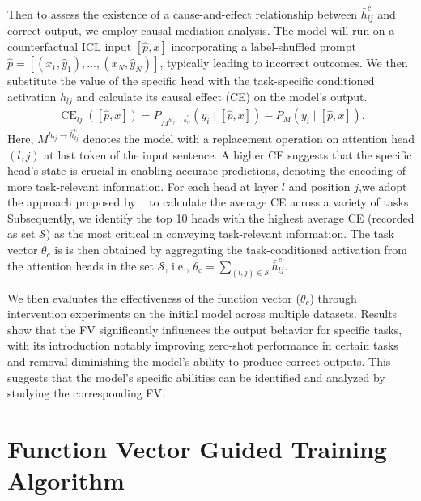 Then to assess the existence of a cause-and-effect relationship between $\bar{h}_{l j}^c$ and correct output, we employ causal mediation analysis. The model will run on a counterfactual ICL input $[\hat{p},x]$ incorporating a label-shuffled prompt $\hat{p}=[(x_1,  \hat{y}_1), ..., (x_N, \hat{y}_N)]$, typically leading to incorrect outcomes.
We then substitute the value of the specific head with the task-specific conditioned activation $\bar{h}_{lj}$ and calculate its causal effect (CE) on the model's output.
\begin{equation}
\begin{aligned}
\operatorname{CE}_{lj}([\hat{p},x])=P_{M^{h_{lj}\rightarrow \bar{h}_{lj}^c}}(y_{i} \mid [\hat{p}, x] ) -P_M(y_{i} \mid [\hat{p}, x]).
\end{aligned}
\end{equation}
Here, $M^{h_{lj}\rightarrow \bar{h}^c_{lj}}$ denotes the model with a replacement operation on attention head $(l,j)$ at last token of the input sentence. A higher CE suggests that the specific head's state is crucial in enabling accurate predictions, denoting the encoding of more task-relevant information.
For each head at layer $l$ and position $j$,we adopt the approach proposed by ~\citet{todd2023function} to calculate the average CE across a variety of tasks. Subsequently, we identify the top 10 heads with the highest average CE (recorded as set $\mathcal{S}$) as the most critical in conveying task-relevant information. The task vector $\theta_c$ is is then obtained by aggregating the task-conditioned activation from the attention heads in the set $\mathcal{S}$, i.e., $\theta_c=\sum_{(l,j) \in \mathcal{S}} \bar{h}_{lj}^c$. 



We then evaluates the effectiveness of the function vector ($\theta_c$) through intervention experiments on the initial model across multiple datasets. Results show that the FV significantly influences the output behavior for specific tasks, with its introduction notably improving zero-shot performance in certain tasks and removal diminishing the model's ability to produce correct outputs. This suggests that the model's specific abilities can be identified and analyzed by studying the corresponding FV.


\section{Function Vector Guided Training Algorithm}
\label{app:algo}
    
